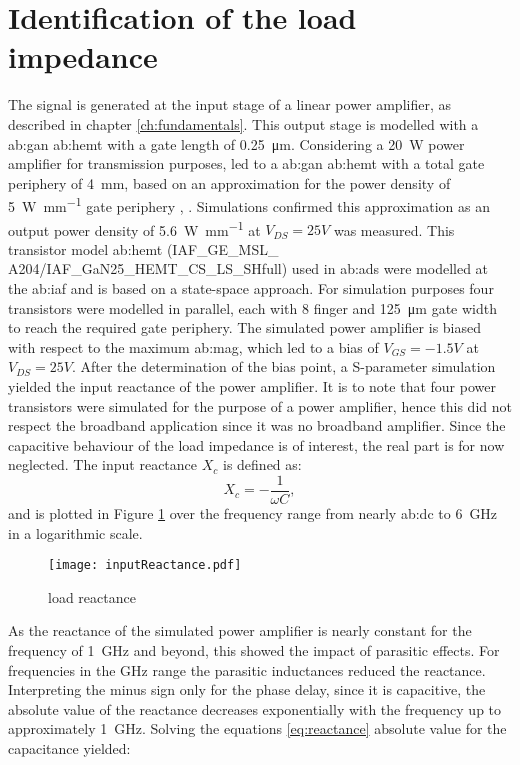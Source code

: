 \section{Identification of the load impedance} %
The signal is generated at the input stage of a linear power amplifier, as described in chapter \ref{ch:fundamentals}.
This output stage is modelled with a \gls{ab:gan} \gls{ab:hemt} with a gate length of \SI{0.25}{\micro \meter}.
Considering a \SI{20}{\watt} power amplifier for transmission purposes, led to a \gls{ab:gan} \gls{ab:hemt} with a total gate periphery of \SI{4}{\milli \metre}, based on an approximation for the power density of \SI[per-mode=fraction]{5}{\watt\per\milli\metre} gate periphery  \cite{Maroldt2010}, \cite{GaNBook}.
Simulations confirmed this approximation as an output power density of \SI[per-mode=fraction]{5.6}{\watt\per\milli\metre} at $V_{DS} = 25 V$ was measured.
This transistor model \gls{ab:hemt} (IAF\_GE\_MSL\_ A204/IAF\_GaN25\_HEMT\_CS\_LS\_SHfull) used in \gls{ab:ads} were modelled at the \gls{ab:iaf}\cite{model} and is based on a state-space approach. 
For simulation purposes four transistors were modelled in parallel, each with 8 finger and \SI{125}{\micro \metre} gate width to reach the required gate periphery.
The simulated power amplifier is biased with respect to the maximum \gls{ab:mag}, which led to a bias of $V_{GS} = -1.5 V$ at $V_{DS} = 25 V$.
After the determination of the bias point, a S-parameter simulation yielded the input reactance of the power amplifier.
It is to note that four power transistors were simulated for the purpose of a power amplifier, hence this did not respect the broadband application since it was no broadband amplifier.
Since the capacitive behaviour of the load impedance is of interest, the real part is for now neglected.
The input reactance $X_c$ is defined as:
\begin{equation}
	X_c = -\frac{1}{\omega C},
\end{equation}
\label{eq:reactance}
and is plotted in Figure \ref{fig:inputReactance} over the frequency range from nearly \gls{ab:dc} to \SI{6}{\giga \hertz} in a logarithmic scale.

\begin{figure}[ht]
	\centering
  \texttt{[image: inputReactance.pdf]}
	\caption{load reactance}
	\label{fig:inputReactance}
\end{figure}

As the reactance of the simulated power amplifier is nearly constant for the frequency of \SI{1}{\giga \hertz} and beyond, this showed the impact of parasitic effects.
For frequencies in the \si{\giga \hertz} range the parasitic inductances reduced the reactance.
Interpreting the minus sign only for the phase delay, since it is capacitive, the absolute value of the reactance decreases exponentially with the frequency up to approximately \SI{1}{\giga \hertz}.
Solving the equations \ref{eq:reactance} absolute value for the capacitance yielded:

